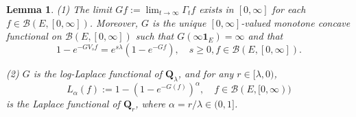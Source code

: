 \documentclass[12pt,a4paper]{amsart}
\numberwithin{equation}{section}
\theoremstyle{plain}
\newtheorem{lem}[thm]{Lemma}
\theoremstyle{definition}
\theoremstyle{remark}
\begin{document}
\begin{lem} \label{prop:G}
(1) The limit $Gf:= \lim_{t\to \infty} \Gamma_t f$ exists in $[0,\infty]$ for each $f\in \mathcal B(E,[0,\infty])$.
	Moreover, $G$ is the unique $[0,\infty]$-valued monotone concave functional on $\mathcal B(E,[0,\infty])$ such that
	$G(\infty  \mathbf 1_E) = \infty$ and that
\begin{equation} \label{eq:G.0}
	1 - e^{- GV_s f}
	= e^{s\lambda} (1 - e^{-Gf}),
	\quad s\geq 0, f\in \mathcal B(E,[0,\infty]).
\end{equation}

(2) $G$ is the log-Laplace functional of $\mathbf Q_\lambda$, and for any $r\in[\lambda, 0)$,
\[
L_\alpha(f):=1-\left(1-e^{-G(f)}\right)^\alpha,\quad  f\in\mathcal B(E,[0,\infty))
\]
is the Laplace functional of $\mathbf Q_r$, where $\alpha=r/\lambda\in(0,1]$.
\end{lem}
\end{document}
